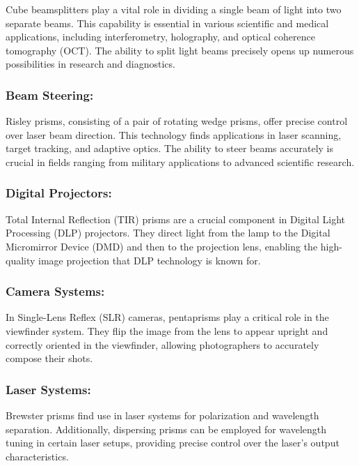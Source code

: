 \documentclass[
  a4paper,
]{book}
\begin{document}
\begin{tcolorbox}
Cube beamsplitters play a vital role in dividing a single beam of light
into two separate beams. This capability is essential in various
scientific and medical applications, including interferometry,
holography, and optical coherence tomography (OCT). The ability to split
light beams precisely opens up numerous possibilities in research and
diagnostics.

\subsubsection{Beam Steering:}\label{beam-steering}

Risley prisms, consisting of a pair of rotating wedge prisms, offer
precise control over laser beam direction. This technology finds
applications in laser scanning, target tracking, and adaptive optics.
The ability to steer beams accurately is crucial in fields ranging from
military applications to advanced scientific research.

\subsubsection{Digital Projectors:}\label{digital-projectors}

Total Internal Reflection (TIR) prisms are a crucial component in
Digital Light Processing (DLP) projectors. They direct light from the
lamp to the Digital Micromirror Device (DMD) and then to the projection
lens, enabling the high-quality image projection that DLP technology is
known for.

\subsubsection{Camera Systems:}\label{camera-systems}

In Single-Lens Reflex (SLR) cameras, pentaprisms play a critical role in
the viewfinder system. They flip the image from the lens to appear
upright and correctly oriented in the viewfinder, allowing photographers
to accurately compose their shots.

\subsubsection{Laser Systems:}\label{laser-systems}

Brewster prisms find use in laser systems for polarization and
wavelength separation. Additionally, dispersing prisms can be employed
for wavelength tuning in certain laser setups, providing precise control
over the laser's output characteristics.


\end{tcolorbox}
\end{document}
